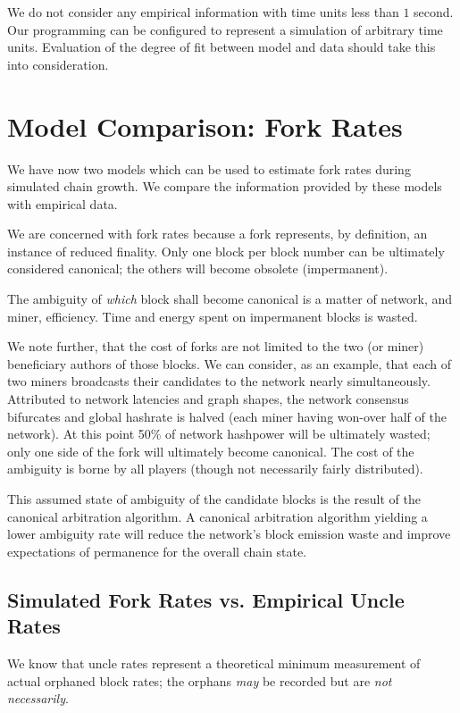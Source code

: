 \documentclass[11pt]{article}
\theoremstyle{plain}
\begin{document}
We do not consider any empirical information with time units less than $1$
second. Our programming can be configured to represent a simulation of
arbitrary time units. Evaluation of the degree of fit between model and
data should take this into consideration.

\section{\normalsize{Model Comparison: Fork Rates}}

We have now two models which can be used to estimate fork rates during
simulated chain growth. We compare the information provided by these models with
empirical data.

We are concerned with fork rates because a fork represents, by definition, an
instance of reduced finality. Only one block per block number can be ultimately
considered canonical; the others will become obsolete (impermanent).

The ambiguity of \emph{which} block shall become canonical is a matter of
network, and miner, efficiency. Time and energy spent on impermanent blocks is 
wasted.

We note further, that the cost of forks are not limited to the two (or miner)
beneficiary authors of those blocks. We can consider, as an example, that each
of two miners broadcasts their candidates to the network nearly simultaneously.
Attributed to network latencies and graph shapes, the network consensus bifurcates
and global hashrate is halved (each miner having won-over half of the network).
At this point 50\% of network hashpower will be ultimately wasted; only one
side of the fork will ultimately become canonical. The cost of the ambiguity is
borne by all players (though not necessarily fairly distributed).

This assumed state of ambiguity of the candidate blocks is the result of the
canonical arbitration algorithm. A canonical arbitration algorithm yielding a
lower ambiguity rate will reduce the network's block emission waste and improve
expectations of permanence for the overall chain state.

\subsection{\normalsize{Simulated Fork Rates vs. Empirical Uncle Rates}}

We know that uncle rates represent a theoretical minimum measurement of actual
orphaned block rates; the orphans \emph{may} be recorded but are \emph{not
necessarily}.
\end{document}
